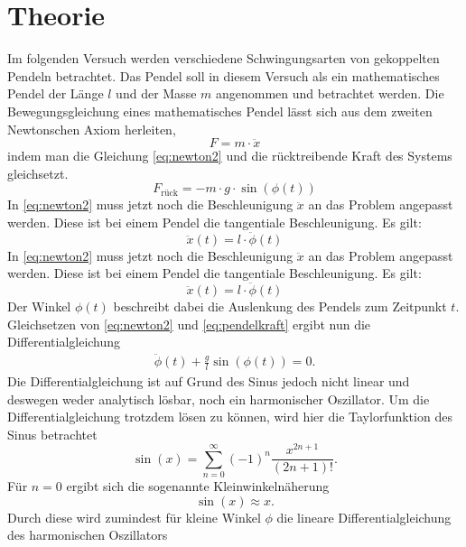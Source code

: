 \section{Theorie}
Im folgenden Versuch werden verschiedene Schwingungsarten von gekoppelten Pendeln betrachtet. Das Pendel soll in diesem Versuch als ein mathematisches Pendel der Länge $l$ und der Masse $m$ angenommen und betrachtet werden.
Die Bewegungsgleichung eines mathematisches Pendel lässt sich aus dem zweiten Newtonschen Axiom herleiten,
\begin{equation}
  F=m\cdot\ddot{x} \label{eq:newton2}
\end{equation}
indem man die Gleichung \eqref{eq:newton2} und die rücktreibende Kraft des Systems gleichsetzt.
\begin{equation}
  F_\text{rück}=-m\cdot g\cdot \sin(\phi(t)) \label{eq:pendelkraft}
\end{equation}
In \eqref{eq:newton2} muss jetzt noch die Beschleunigung $\ddot x$ an das Problem angepasst werden. Diese ist bei einem Pendel die tangentiale
Beschleunigung. Es gilt:
\begin{equation}
  \ddot x(t)=l\cdot \ddot{\phi}(t)
\end{equation}
In \eqref{eq:newton2} muss jetzt noch die Beschleunigung $\ddot x$ an das Problem angepasst werden. Diese ist bei einem Pendel die tangentiale
Beschleunigung. Es gilt:
\begin{equation}
  \ddot x(t)=l\cdot \ddot{\phi}(t)
\end{equation}
Der Winkel $\phi(t)$ beschreibt dabei die Auslenkung des Pendels zum Zeitpunkt $t$. Gleichsetzen von \eqref{eq:newton2} und
\eqref{eq:pendelkraft} ergibt nun die Differentialgleichung
\begin{eqnarray}
  \ddot{\phi}(t)+\frac{g}{l}\sin(\phi(t))=0.
\end{eqnarray}
Die Differentialgleichung ist auf Grund des Sinus jedoch nicht linear und deswegen weder analytisch lösbar, noch ein harmonischer Oszillator.
Um die Differentialgleichung trotzdem lösen zu können, wird hier die Taylorfunktion des Sinus betrachtet
\begin{equation}
  \sin(x)=\sum_{n=0}^\infty (-1)^n\frac{x^{2n+1}}{(2n+1)!}.
\end{equation}
Für $n=0$ ergibt sich die sogenannte Kleinwinkelnäherung
\begin{equation}
  \sin(x)\approx x. \label{eq:kleinwinkel}
\end{equation}
Durch diese wird zumindest für kleine Winkel $\phi$ die lineare Differentialgleichung des harmonischen Oszillators
